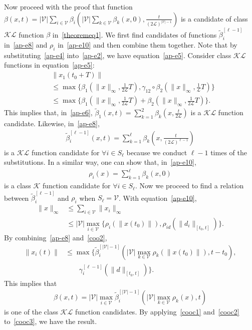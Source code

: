 \documentclass[journal]{IEEEtran}
\newcommand{\nnum}{\nonumber}
\newcommand{\KK}{{\mathcal{K}}}
\newcommand{\LL}{{\mathcal{L}}}
\newcommand{\VV}{{\mathcal{V}}}
\begin{document}
\begin{IEEEproof}
Now proceed with the proof that function $\beta(x,t) = |{\VV}|\sum_{i \in {\VV}}\beta_i(|{\VV}|\sum_{k \in {\VV}}\beta_k(x,0),\frac{t}{(2\LL)^{|{\VV}|-1}})$ is a candidate of class $\KK\LL$ function $\beta$ in~\eqref{theoremeq1}.
We first find candidates of functions $\tilde{\beta}_i^{[\ell-1]}$ in~\eqref{ap-e8} and $\rho_i$ in~\eqref{ap-e10} and then combine them together.
Note that by substituting~\eqref{ap-e4} into~\eqref{ap-e2}, we have equation~\eqref{ap-e5}.
Consider class $\KK\LL$ functions in equation~\eqref{ap-e5}:
\begin{align*}
&\|x_1(t_0+T)\|\nnum\\
&\leq \max\{\beta_1(\|x\|_{\infty},\frac{1}{2\LL}T),\gamma_{12}\circ\beta_2(\|x\|_{\infty},\frac{1}{\LL}T)\}\nnum\\
&\leq \max\{\beta_1(\|x\|_{\infty},\frac{1}{2\LL}T)+\beta_2(\|x\|_{\infty},\frac{1}{2\LL}T)\}.
\end{align*}
This implies that, in~\eqref{ap-e6}, $\tilde{\beta}_1(x,t) = \sum_{k=1}^{2}\beta_{k}(x,\frac{t}{2\LL})$ is a $\KK \LL$ function candidate.
Likewise, in~\eqref{ap-e8},
\begin{align}
\tilde{\beta}_i^{[\ell-1]}(x,t)=\sum_{k=1}^{\ell}\beta_k(x,\frac{t}{(2\LL)^{\ell-1}})
\label{cooc1}
\end{align}
is a $\KK \LL$ function candidate for $\forall i \in S_{\ell}$ because we conduct $\ell-1$ times of the substitutions.
In a similar way, one can show that, in~\eqref{ap-e10},
\begin{align}
\rho_i(x) = \sum_{k=1}^{\ell}\beta_k(x,0)
\label{cooc2}
\end{align}
is a class $\KK$ function candidate for $\forall i \in S_{\ell}$.
Now we proceed to find a relation between $\tilde{\beta}_i^{[\ell-1]}$ and $\rho_i$ when $S_{\ell}={\VV}$.
With equation~\eqref{ap-e10},
\begin{align}
\|x\|_{\infty} &\leq \sum_{i \in {\VV}}\|x_i\|_{\infty} \nnum\\
&\leq |{\VV}| \max_{i \in {\VV}}\{\rho_{i}(\|x(t_0)\|),\rho_{id}(\|d_i\|_{[t_0,t]})\}.
\label{coo2}
\end{align}
By combining~\eqref{ap-e8} and~\eqref{coo2}, 
\begin{align*}
\|x_i(t)\|&\leq \max\{\tilde{\beta}^{[|{\VV}|-1]}_i (|{\VV}|\max_{k \in {\VV}}\rho_k(\|x(t_0)\|),t-t_0),\nnum\\
&\ \ \ \ \ \ \ \ \ \gamma_i^{[\ell-1]}(\|d\|_{[t_0,t]})\}.
\end{align*}
This implies that 
\begin{align}
\beta(x,t) = |{\VV}|\max_{i \in {\VV}}\tilde{\beta}^{[|{\VV}|-1]}_i(|{\VV}|\max_{k \in {\VV}}\rho_k(x),t)
\label{cooc3}
\end{align}
is one of the class $\KK\LL$ function candidates.
By applying~\eqref{cooc1} and~\eqref{cooc2} to~\eqref{cooc3}, we have the result.
\end{IEEEproof}
\end{document}
